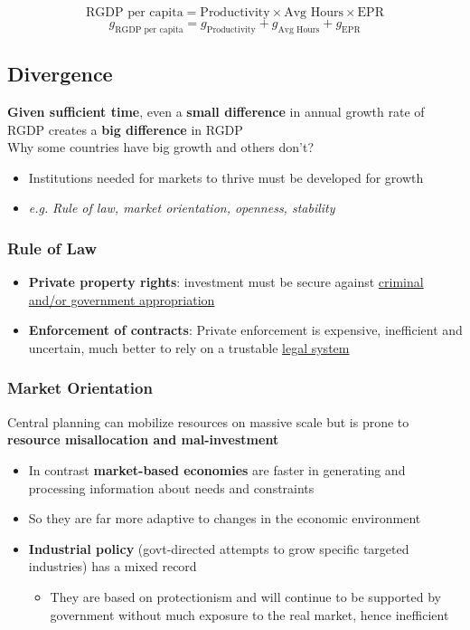 \documentclass{article}
\newcommand{\eg}[0]{\textit{e.g. }}
\begin{document}
\begin{multicols}{2}
$$\text{RGDP per capita} = \text{Productivity} \times \text{Avg Hours} \times \text{EPR}$$
$$g_{\text{RGDP per capita}} = g_{\text{Productivity}} + g_{\text{Avg Hours}} + g_{\text{EPR}}$$

\subsection{Divergence}
\textbf{Given sufficient time}, even a \textbf{small difference} in annual growth rate of RGDP creates a \textbf{big difference} in RGDP\\
Why some countries have big growth and others don't?
\begin{itemize}
	\item Institutions needed for markets to thrive must be developed for growth
	\item \eg \textit{Rule of law, market orientation, openness, stability}
\end{itemize}
\subsubsection{Rule of Law}
\begin{itemize}
	\item \textbf{Private property rights}: investment must be secure against \underline{criminal and/or government appropriation}
	\item \textbf{Enforcement of contracts}: Private enforcement is expensive, inefficient and uncertain, much better to rely on a trustable \underline{legal system}
\end{itemize}
\subsubsection{Market Orientation}
Central planning can mobilize resources on massive scale but is prone to \textbf{resource misallocation and mal-investment}
\begin{itemize}
	\item In contrast \textbf{market-based economies} are faster in generating and processing information about needs and constraints
	\item So they are far more adaptive to changes in the economic environment
	\item \textbf{Industrial policy} (govt-directed attempts to grow specific targeted industries) has a mixed record
	\begin{itemize}
		\item They are based on protectionism and will continue to be supported by government without much exposure to the real market, hence inefficient
	\end{itemize}
\end{itemize}

\end{multicols}
\end{document}

